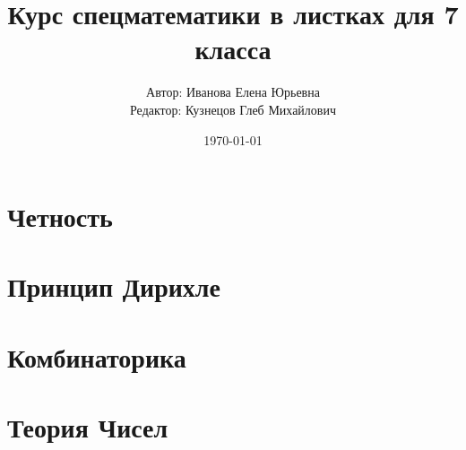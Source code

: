 \documentclass[11pt,a4paper]{report}
\title{Курс спецматематики в листках для 7 класса}
\author{Автор: Иванова Елена Юрьевна\\
	Редактор: Кузнецов Глеб Михайлович}
\date{\today}
\theoremstyle{myrmk}
\theoremstyle{mypln}
\theoremstyle{mydfn}
\begin{document}
		\maketitle
		\tableofcontents
		\newpage

\chapter{Четность}









\chapter{Принцип Дирихле}



\chapter{Комбинаторика}




\chapter{Теория Чисел}

\end{document}
